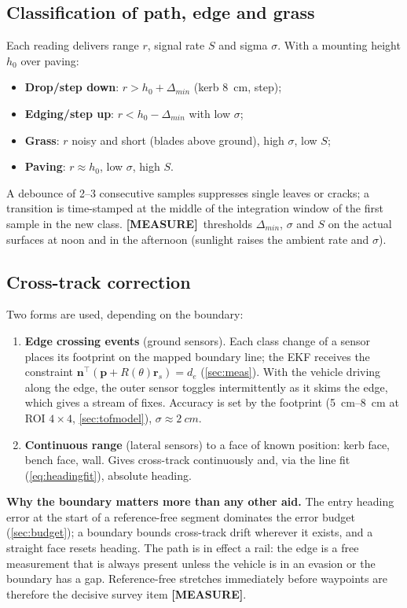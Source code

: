 \documentclass[11pt,a4paper]{article}
\newcommand{\mk}[2]{\textsf{\scriptsize\bfseries\colorbox{#1bg}{\color{#1}[#2]}}}
\newcommand{\MEASURE}{\mk{warn}{MEASURE}}
\newcommand{\T}{^{\!\top}}
\newcommand{\vect}[1]{\bm{#1}}
\begin{document}
\subsection{Classification of path, edge and grass}

Each reading delivers range $r$, signal rate $S$ and sigma $\sigma$. With a
mounting height $h_0$ over paving:
\begin{itemize}[leftmargin=6mm]
\item \textbf{Drop/step down}: $r>h_0+\Delta_{min}$ (kerb \qty{8}{cm}, step);
\item \textbf{Edging/step up}: $r<h_0-\Delta_{min}$ with low $\sigma$;
\item \textbf{Grass}: $r$ noisy and short (blades above ground), high $\sigma$,
low $S$;
\item \textbf{Paving}: $r\approx h_0$, low $\sigma$, high $S$.
\end{itemize}
A debounce of 2--3 consecutive samples suppresses single leaves or cracks; a
transition is time-stamped at the middle of the integration window of the first
sample in the new class. \MEASURE\ thresholds $\Delta_{min}$, $\sigma$ and $S$ on
the actual surfaces at noon and in the afternoon (sunlight raises the ambient
rate and $\sigma$).

\subsection{Cross-track correction}

Two forms are used, depending on the boundary:

\begin{enumerate}[leftmargin=6mm]
\item \textbf{Edge crossing events} (ground sensors). Each class change of a
sensor places its footprint on the mapped boundary line; the EKF receives the
constraint $\vect n\T(\vect p+R(\theta)\vect r_s)=d_e$
(\cref{sec:meas}). With the vehicle driving along the edge, the outer sensor
toggles intermittently as it skims the edge, which gives a stream of fixes.
Accuracy is set by the footprint (\qtyrange{5}{8}{cm} at ROI $4\times4$,
\cref{sec:tofmodel}), $\sigma\approx\qty{2}{cm}$.
\item \textbf{Continuous range} (lateral sensors) to a face of known position:
kerb face, bench face, wall. Gives cross-track continuously and, via the line
fit (\cref{eq:headingfit}), absolute heading.
\end{enumerate}

\begin{keybox}
\textbf{Why the boundary matters more than any other aid.} The entry heading
error at the start of a reference-free segment dominates the error budget
(\cref{sec:budget}); a boundary bounds cross-track drift wherever it exists, and
a straight face resets heading. The path is in effect a rail: the edge is a free
measurement that is always present unless the vehicle is in an evasion or the
boundary has a gap. Reference-free stretches immediately before waypoints are
therefore the decisive survey item \MEASURE.
\end{keybox}
\end{document}
